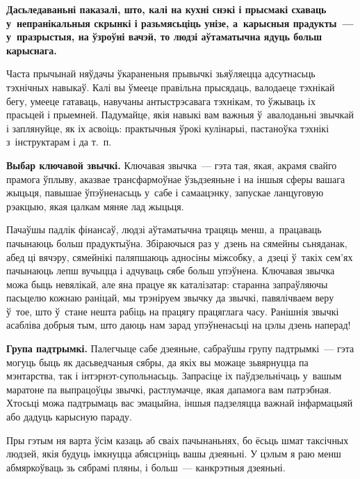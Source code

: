 \textbf{Дасьледаваньні паказалі, што, калі на кухні снэкі і прысмакі схаваць у~непранікальныя скрынкі і разьмясьціць унізе, а~карысныя прадукты~--- у~празрыстыя, на ўзроўні вачэй, то людзі аўтаматычна ядуць больш карыснага.} 

Часта прычынай няўдачы ўкараненьня прывычкі зьяўляецца адсутнасьць тэхнічных навыкаў. Калі вы ўмееце правільна прысядаць, валодаеце тэхнікай бегу, умееце гатаваць, навучаны антыстрэсавага тэхнікам, то ўжываць іх прасьцей і прыемней. Падумайце, якія навыкі вам важныя ў~авалоданьні звычкай і заплянуйце, як іх асвоіць: практычныя ўрокі кулінарыі, пастаноўка тэхнікі з~інструктарам і да т.~п.

\textbf{Выбар ключавой звычкі.} Ключавая звычка~--- гэта тая, якая, акрамя свайго прамога ўплыву, аказвае трансфармоўнае ўзьдзеяньне і на іншыя сферы вашага жыцьця, павышае ўпэўненасьць у~сабе і самаацэнку, запускае ланцуговую рэакцыю, якая цалкам мяняе лад жыцьця.


Пачаўшы падлік фінансаў, людзі аўтаматычна трацяць менш, а~працаваць пачынаюць больш прадуктыўна. Збіраючыся раз у~дзень на сямейны сьняданак, абед ці вячэру, сямейнікі паляпшаюць адносіны міжсобку, а~дзеці ў~такіх сем'ях пачынаюць лепш вучыцца і адчуваць сябе больш упэўнена. Ключавая звычка можа быць невялікай, але яна працуе як каталізатар: старанна запраўляючы пасьцелю кожнаю раніцай, мы трэніруем звычку да звычкі, павялічваем веру ў~тое, што ў~стане нешта рабіць на працягу працяглага часу. Ранішнія звычкі асабліва добрыя тым, што даюць нам зарад упэўненасьці на цэлы дзень наперад!

\textbf{Група падтрымкі.} Палегчыце сабе дзеяньне, сабраўшы групу падтрымкі~--- гэта могуць быць як дасьведчаныя сябры, да якіх вы можаце зьвярнуцца па мэнтарства, так і інтэрнэт-супольнасьць. Запрасіце іх паўдзельнічаць у~вашым маратоне па выпрацоўцы звычкі, растлумачце, якая дапамога вам патрэбная. Хтосьці можа падтрымаць вас эмацыйна, іншыя падзеляцца важнай інфармацыяй або дадуць карысную параду. 


Пры гэтым ня варта ўсім казаць аб сваіх пачынаньнях, бо ёсьць шмат таксічных людзей, якія будуць імкнуцца абясцэніць вашы дзеяньні. У цэлым я раю менш абмяркоўваць зь сябрамі пляны, і больш~--- канкрэтныя дзеяньні. 

